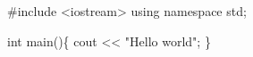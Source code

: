 
\begin{DoxyCode}
#include <iostream>
using namespace std;


int main()\{
    cout << "Hello world";
\}
\end{DoxyCode}
 